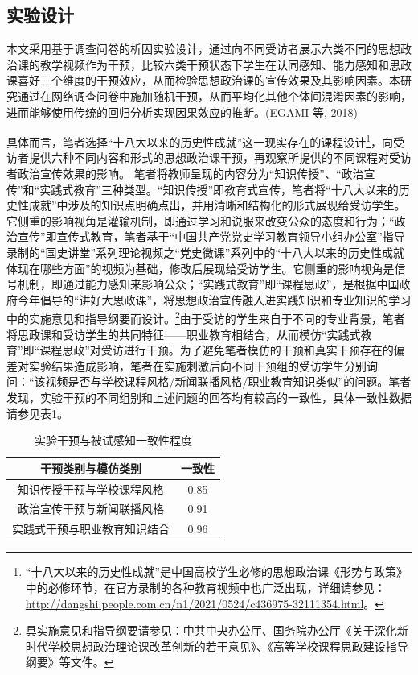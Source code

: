 \documentclass[
  12pt,
]{ctexart}
\begin{document}
\hypertarget{ux5b9eux9a8cux8bbeux8ba1}{%
\subsection{实验设计}\label{ux5b9eux9a8cux8bbeux8ba1}}

本文采用基于调查问卷的析因实验设计，通过向不同受访者展示六类不同的思想政治课的教学视频作为干预，比较六类干预状态下学生在认同感知、能力感知和思政课喜好三个维度的干预效应，从而检验思想政治课的宣传效果及其影响因素。本研究通过在网络调查问卷中施加随机干预，从而平均化其他个体间混淆因素的影响，进而能够使用传统的回归分析实现因果效应的推断。(\protect\hyperlink{ref-EgamiImai2018}{EGAMI 等, 2018})

具体而言，笔者选择``十八大以来的历史性成就''这一现实存在的课程设计\footnote{``十八大以来的历史性成就''是中国高校学生必修的思想政治课《形势与政策》中的必修环节，在官方录制的各种教育视频中也广泛出现，详细请参见：\url{http://dangshi.people.com.cn/n1/2021/0524/c436975-32111354.html}。}，向受访者提供六种不同内容和形式的思想政治课干预，再观察所提供的不同课程对受访者政治宣传效果的影响。
笔者将教师呈现的内容分为``知识传授''、``政治宣传''和``实践式教育''三种类型。``知识传授''即教育式宣传，笔者将``十八大以来的历史性成就''中涉及的知识点明确点出，并用清晰和结构化的形式展现给受访学生。它侧重的影响视角是灌输机制，即通过学习和说服来改变公众的态度和行为；``政治宣传''即宣传式教育，笔者基于``中国共产党党史学习教育领导小组办公室''指导录制的``国史讲堂''系列理论视频之``党史微课''系列中的``十八大以来的历史性成就体现在哪些方面''的视频为基础，修改后展现给受访学生。它侧重的影响视角是信号机制，即通过能力感知来影响公众；``实践式教育''即``课程思政''，是根据中国政府今年倡导的``讲好大思政课''，将思想政治宣传融入进实践知识和专业知识的学习中的实施意见和指导纲要而设计。\footnote{具实施意见和指导纲要请参见：中共中央办公厅、国务院办公厅《关于深化新时代学校思想政治理论课改革创新的若干意见》、《高等学校课程思政建设指导纲要》等文件。}由于受访的学生来自于不同的专业背景，笔者将思政课和受访学生的共同特征------职业教育相结合，从而模仿``实践式教育''即``课程思政''对受访进行干预。为了避免笔者模仿的干预和真实干预存在的偏差对实验结果造成影响，笔者在实施刺激后向不同干预组的受访学生分别询问：``该视频是否与学校课程风格/新闻联播风格/职业教育知识类似''的问题。笔者发现，实验干预的不同组别和上述问题的回答均有较高的一致性，具体一致性数据请参见表1。

\begin{table}[!h]

\caption{\label{tab:unnamed-chunk-3}实验干预与被试感知一致性程度}
\centering
\begin{tabular}[t]{cc}
\toprule
干预类别与模仿类别 & 一致性\\
\midrule
知识传授干预与学校课程风格 & 0.85\\
政治宣传干预与新闻联播风格 & 0.91\\
实践式干预与职业教育知识结合 & 0.96\\
\bottomrule
\end{tabular}
\end{table}
\end{document}
